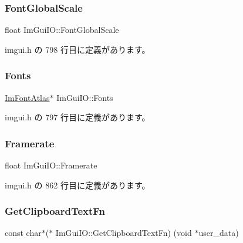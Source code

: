 \subsubsection{\texorpdfstring{Font\+Global\+Scale}{FontGlobalScale}}
{\footnotesize\ttfamily float Im\+Gui\+I\+O\+::\+Font\+Global\+Scale}



 imgui.\+h の 798 行目に定義があります。

\mbox{\label{struct_im_gui_i_o_a24e4f5201fe8780267abc2acfc24254c}} 
\subsubsection{\texorpdfstring{Fonts}{Fonts}}
{\footnotesize\ttfamily \mbox{\hyperlink{struct_im_font_atlas}{Im\+Font\+Atlas}}$\ast$ Im\+Gui\+I\+O\+::\+Fonts}



 imgui.\+h の 797 行目に定義があります。

\mbox{\label{struct_im_gui_i_o_a8c6c2be54ddeda3cfb4a73cf95701a54}} 
\subsubsection{\texorpdfstring{Framerate}{Framerate}}
{\footnotesize\ttfamily float Im\+Gui\+I\+O\+::\+Framerate}



 imgui.\+h の 862 行目に定義があります。

\mbox{\label{struct_im_gui_i_o_ab7face2b2efef720a22a7fb2143d415c}} 
\subsubsection{\texorpdfstring{Get\+Clipboard\+Text\+Fn}{GetClipboardTextFn}}
{\footnotesize\ttfamily const char$\ast$($\ast$ Im\+Gui\+I\+O\+::\+Get\+Clipboard\+Text\+Fn) (void $\ast$user\+\_\+data)}



